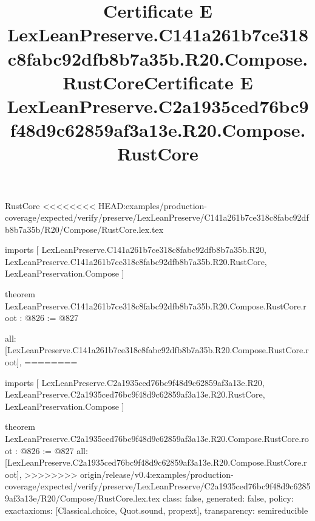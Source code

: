 \begin{lexlean}{RustCore}
<<<<<<<< HEAD:examples/production-coverage/expected/verify/preserve/LexLeanPreserve/C141a261b7ce318c8fabc92dfb8b7a35b/R20/Compose/RustCore.lex.tex
\title{Certificate E LexLeanPreserve.C141a261b7ce318c8fabc92dfb8b7a35b.R20.Compose.RustCore}
\begin{coremodule}
imports [
  LexLeanPreserve.C141a261b7ce318c8fabc92dfb8b7a35b.R20,
  LexLeanPreserve.C141a261b7ce318c8fabc92dfb8b7a35b.R20.RustCore,
  LexLeanPreservation.Compose
]

theorem LexLeanPreserve.C141a261b7ce318c8fabc92dfb8b7a35b.R20.Compose.RustCore.root : @826 := @827 {
  all: [LexLeanPreserve.C141a261b7ce318c8fabc92dfb8b7a35b.R20.Compose.RustCore.root],
========
\title{Certificate E LexLeanPreserve.C2a1935ced76bc9f48d9c62859af3a13e.R20.Compose.RustCore}
\begin{coremodule}
imports [
  LexLeanPreserve.C2a1935ced76bc9f48d9c62859af3a13e.R20,
  LexLeanPreserve.C2a1935ced76bc9f48d9c62859af3a13e.R20.RustCore,
  LexLeanPreservation.Compose
]

theorem LexLeanPreserve.C2a1935ced76bc9f48d9c62859af3a13e.R20.Compose.RustCore.root : @826 := @827 {
  all: [LexLeanPreserve.C2a1935ced76bc9f48d9c62859af3a13e.R20.Compose.RustCore.root],
>>>>>>>> origin/release/v0.4:examples/production-coverage/expected/verify/preserve/LexLeanPreserve/C2a1935ced76bc9f48d9c62859af3a13e/R20/Compose/RustCore.lex.tex
  class: false,
  generated: false,
  policy: exact{axioms: [Classical.choice, Quot.sound, propext]},
  transparency: semireducible
}


\end{coremodule}}
\end{coremodule}
\end{lexlean}

